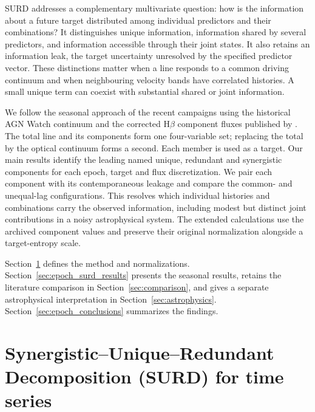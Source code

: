\documentclass[fleqn,usenatbib]{mnras}
\begin{document}
SURD \citep{MartinezSanchez2024SURD,MartinezSanchez2025Thesis} addresses a complementary multivariate question: how is the information about a future target distributed among individual predictors and their combinations? It distinguishes unique information, information shared by several predictors, and information accessible through their joint states. It also retains an information leak, the target uncertainty unresolved by the specified predictor vector. These distinctions matter when a line responds to a common driving continuum and when neighbouring velocity bands have correlated histories. A small unique term can coexist with substantial shared or joint information.

We follow the seasonal approach of the recent campaigns using the historical AGN Watch continuum and the corrected H$\beta$ component fluxes published by \citet{WandersPeterson1996}. The total line and its components form one four-variable set; replacing the total by the optical continuum forms a second. Each member is used as a target. Our main results identify the leading named unique, redundant and synergistic components for each epoch, target and flux discretization. We pair each component with its contemporaneous leakage and compare the common- and unequal-lag configurations. This resolves which individual histories and combinations carry the observed information, including modest but distinct joint contributions in a noisy astrophysical system. The extended calculations use the archived component values and preserve their original normalization alongside a target-entropy scale.

Section~\ref{sec:surd_method} defines the method and normalizations. Section~\ref{sec:epoch_surd_results} presents the seasonal results, retains the literature comparison in Section~\ref{sec:comparison}, and gives a separate astrophysical interpretation in Section~\ref{sec:astrophysics}. Section~\ref{sec:epoch_conclusions} summarizes the findings.

\section{Synergistic--Unique--Redundant Decomposition (SURD) for time series}
\label{sec:surd_method}
\end{document}
